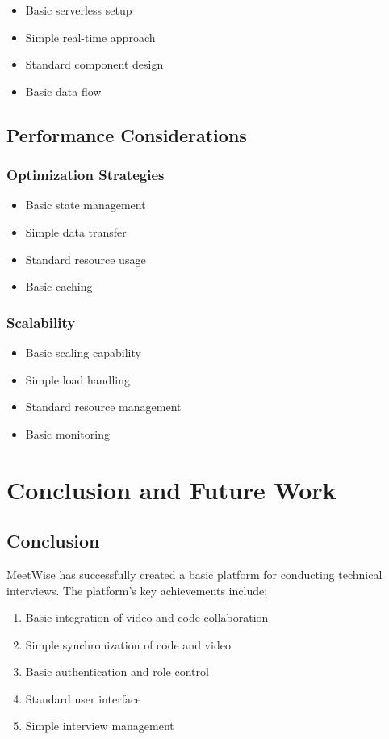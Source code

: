 \documentclass[12pt,a4paper]{report}
\begin{document}
\begin{itemize}
   \item Basic serverless setup
   \item Simple real-time approach
   \item Standard component design
   \item Basic data flow
\end{itemize}

\section{Performance Considerations}

\subsection{Optimization Strategies}
\begin{itemize}
   \item Basic state management
   \item Simple data transfer
   \item Standard resource usage
   \item Basic caching
\end{itemize}

\subsection{Scalability}
\begin{itemize}
   \item Basic scaling capability
   \item Simple load handling
   \item Standard resource management
   \item Basic monitoring
\end{itemize}

\chapter{Conclusion and Future Work}

\section{Conclusion}
MeetWise has successfully created a basic platform for conducting technical interviews. The platform's key achievements include:

\begin{enumerate}
    \item Basic integration of video and code collaboration
    \item Simple synchronization of code and video
    \item Basic authentication and role control
    \item Standard user interface
    \item Simple interview management
\end{enumerate}
\end{document}
